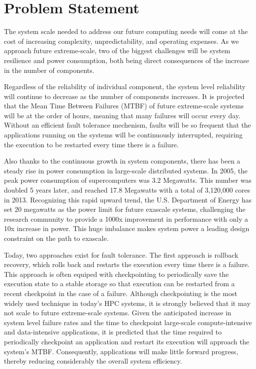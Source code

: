 \section{Problem Statement}

The system scale needed to address our future computing needs will come at the cost of increasing complexity, unpredictability, 
and operating expenses. As we approach future extreme-scale, two of the biggest challenges will be system resilience and power 
consumption, both being direct consequences of the increase in the number of components. 

Regardless of the reliability of individual component, the system level reliability will continue to decrease as the number of 
components increases. It is projected that the Mean Time Between Failures (MTBF) of future extreme-scale systems will be at the order of hours, meaning 
that many failures will occur every day. Without an efficient fault tolerance mechenism, faults will be so frequent that the applications running on the 
systems will be continuously interrupted, requiring the execution to be restarted every time there is a failure. 

Also thanks to the continuous growth in system components, there has been a steady rise in power consumption in large-scale distributed systems. 
In 2005, the peak power consumption of supercomputers was 3.2 Megawatts. This number was doubled 5 years later, and reached 17.8 
Megawatts with a total of 3,120,000 cores in 2013. Recognizing this rapid upward trend, the U.S. Department of Energy has set 20 
megawatts as the power limit for future exascale systems, 
challenging the research community to provide a 1000x improvement in performance with only a 10x increase in power. 
This huge imbalance makes system power a leading design constraint on the path to exascale. 

Today, two approaches exist for fault tolerance. The first approach is rollback recovery, which rolls back and restarts the execution 
every time there is a failure. This approach is often equiped with checkpointing to periodically save the execution state to a 
stable storage so that execution can be restarted from a recent checkpoint in the case of a failure. 
Although checkpointing is the most widely used technique in today's HPC systems, it is strongly believed that it may not scale to 
future extreme-scale systems. Given the anticipated increase in system level failure rates and the time to checkpoint large-scale compute-intensive and data-intensive applications, it is predicted that the time required to periodically checkpoint an application and restart its execution will approach the system’s MTBF. Consequently, applications will make little forward progress, thereby reducing considerably the overall system efficiency. 

